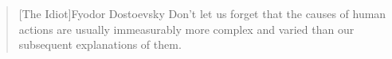 
\begin{quote}[The Idiot]{Fyodor Dostoevsky}
    Don’t let us forget that the causes of human actions are usually immeasurably more complex and varied than our subsequent explanations of them.
\end{quote}
